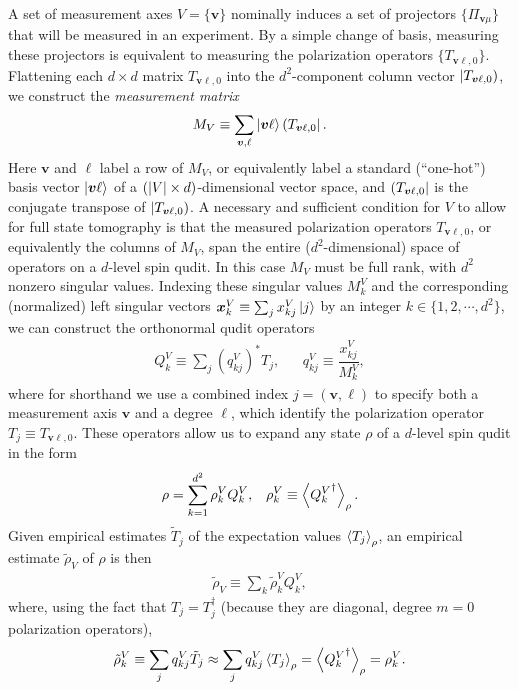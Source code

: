 \documentclass[nofootinbib,twocolumn]{revtex4-1}
\newcommand{\f}[2]{\dfrac{#1}{#2}} %
\newcommand{\p}[1]{\left(#1\right)} %
\newcommand{\bk}{\Braket} %
\renewcommand{\set}[1]{\{#1\}} %
\def\obra#1{\mathinner{({#1}|}}
\def\oket#1{\mathinner{|{#1})}}
\begin{document}
A set of measurement axes $V=\set{\bm v}$ nominally induces a set of projectors $\set{\Pi_{\bm v\mu}}$ that will be measured in an experiment.
By a simple change of basis, measuring these projectors is equivalent to measuring the polarization operators $\set{T_{\bm v\ell,0}}$.
Flattening each $d\times d$ matrix $T_{\bm v\ell,0}$ into the $d^2$-component column vector $\oket{T_{\bm v\ell,0}}$, we construct the {\it measurement matrix}
\begin{align}
  M_V \equiv \sum_{\bm v,\ell} \ket{\bm v\ell} \obra{T_{\bm v\ell,0}}.
  \label{eq:meas_mat}
\end{align}
Here $\bm v$ and $\ell$ label a row of $M_V$, or equivalently label a standard (``one-hot'') basis vector $\ket{\bm v\ell}$ of a $\p{\abs{V}\times d}$-dimensional vector space, and $\obra{T_{\bm v\ell,0}}$ is the conjugate transpose of $\oket{T_{\bm v\ell,0}}$.
A necessary and sufficient condition for $V$ to allow for full state tomography is that the measured polarization operators $T_{\bm v\ell,0}$, or equivalently the columns of $M_V$, span the entire ($d^2$-dimensional) space of operators on a $d$-level spin qudit.
In this case $M_V$ must be full rank, with $d^2$ nonzero singular values.
Indexing these singular values $M^V_k$ and the corresponding (normalized) left singular vectors $\bm x^V_k\equiv \sum_j x^V_{kj} \ket{j}$ by an integer $k\in\set{1,2,\cdots,d^2}$, we can construct the orthonormal qudit operators
\begin{align}
  Q^V_k \equiv \sum_j \p{q^V_{kj}}^* T_j,
  &&
  q^V_{kj} \equiv \f{x^V_{kj}}{M^V_k},
\end{align}
where for shorthand we use a combined index $j=\p{\bm v,\ell}$ to specify both a measurement axis $\bm v$ and a degree $\ell$, which identify the polarization operator $T_j\equiv T_{\bm v\ell,0}$.
These operators allow us to expand any state $\rho$ of a $d$-level spin qudit in the form
\begin{align}
  \rho = \sum_{k=1}^{d^2} \rho_k^V Q_k^V,
  &&
  \rho_k^V \equiv \bk{{Q^V_k}^\dag}_\rho.
\end{align}
Given empirical estimates $\tilde T_j$ of the expectation values $\bk{T_j}_\rho$, an empirical estimate $\tilde\rho_V$ of $\rho$ is then
\begin{align}
  \tilde\rho_V \equiv \sum_k \tilde\rho^V_k Q^V_k,
  \label{eq:reconstructed_state}
\end{align}
where, using the fact that $T_j=T_j^\dag$ (because they are diagonal, degree $m=0$ polarization operators),
\begin{align}
  \tilde\rho^V_k \equiv \sum_j q^V_{kj} \tilde T_j
  \approx \sum_j q^V_{kj} \bk{T_j}_\rho
  = \bk{{Q^V_k}^\dag}_\rho
  = \rho^V_k.
\end{align}
\end{document}
